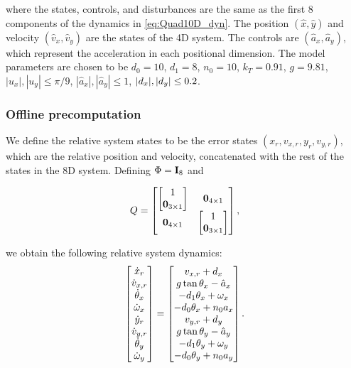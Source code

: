 \noindent where the states, controls, and disturbances are the same as the first 8 components of the dynamics in \eqref{eq:Quad10D_dyn}. 
The position $(\hat x,\hat y)$ and velocity $(\hat v_x, \hat v_y)$ are the states of the 4D system. 
The controls are $(\hat a_x, \hat a_y)$, which represent the acceleration in each positional dimension. 
The model parameters are chosen to be $d_0=10$, $d_1=8$, $n_0=10$, $k_T=0.91$, $g=9.81$, $|u_x|, |u_y| \le \pi/9$, $|\hat a_x|, |\hat a_y| \le 1$, $|d_x|, |d_y| \le 0.2$.

\subsubsection{Offline precomputation}
We define the relative system states to be the error states $(x_r, v_{x,r}, y_r, v_{y,r})$, which are the relative position and velocity, concatenated with the rest of the states in the 8D system.
Defining $\Phi = \mathbf I_8$ and 

\begin{equation*}
Q = 
\begin{bmatrix}
  \begin{bmatrix} 1 \\ \mathbf 0_{3 \times 1} \end{bmatrix} 
    & \mathbf 0_{4\times 1} \\
  \mathbf 0_{4\times 1} 
    & \begin{bmatrix} 1 \\ \mathbf 0_{3 \times 1} \end{bmatrix} 
\end{bmatrix},
\end{equation*}

\noindent we obtain the following relative system dynamics:
\begin{equation}
\label{eq:Quad8DRel_dyn}
\begin{bmatrix}
\dot x_r\\
\dot v_{x,r}\\
\dot \theta_x\\
\dot \omega_x\\
\dot y_r\\
\dot v_{y,r}\\
\dot \theta_y\\
\dot \omega_y\\
\end{bmatrix} =
\begin{bmatrix}
v_{x,r} + \dstb_x\\
g \tan \theta_x - \hat a_x\\
-d_1 \theta_x + \omega_x\\
-d_0 \theta_x + n_0 a_x\\
v_{y,r} + \dstb_y\\
g \tan \theta_y - \hat a_y\\
-d_1 \theta_y + \omega_y\\
-d_0 \theta_y + n_0 a_y\\
\end{bmatrix}.
\end{equation}

